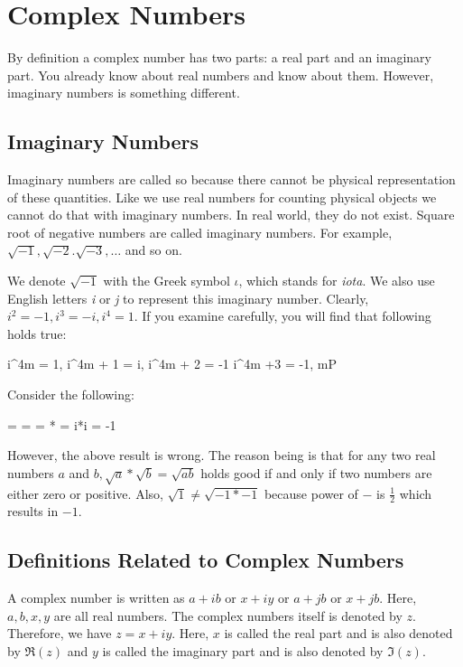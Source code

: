 \chapter{Complex Numbers}
By definition a complex number has two parts: a real part and an imaginary part. You already know about real numbers and know about
them. However, imaginary numbers is something different.
\section{Imaginary Numbers}
Imaginary numbers are called so because there cannot be physical representation of these quantities. Like we use real numbers for
counting physical objects we cannot do that with imaginary numbers. In real world, they do not exist. Square root of negative
numbers are called imaginary numbers. For example, $\sqrt{-1}, \sqrt{-2}. \sqrt{-3}, \ldots$ and so on.

We denote $\sqrt{-1}$ with the Greek symbol $\iota$, which stands for {\it iota}. We also use English letters {\it i} or
{\it j} to represent this imaginary number. Clearly, $i^2 = -1, i^3 = -i, i^4 = 1$. If you examine carefully, you will find that
following holds true:

\startformula i^{4m} = 1, i^{4m + 1} = i, i^{4m + 2} = -1  i^{4m +3} = -1, \forall m\in P\stopformula

{\bf\color[red]{Gotcha:}}

Consider the following:

 =  =  = * = i*i = -1\stopformula

However, the above result is wrong. The reason being is that for any two real numbers $a$ and $b, \sqrt{a}*\sqrt{b} = \sqrt{ab}$
holds good if and only if two numbers are either zero or positive. Also, $\sqrt{1}\neq \sqrt{-1*-1}$ because power of $-$ is
$\frac{1}{2}$ which results in $-1$.

\section{Definitions Related to Complex Numbers}
A complex number is written as $a + ib$ or $x + iy$ or $a + jb$ or $x + jb$. Here, $a, b, x, y$ are all real numbers. The complex
numbers itself is denoted by $z$. Therefore, we have $z = x + iy$. Here, $x$ is called the real part and is also denoted by $\Re(z)$
and $y$ is called the imaginary part and is also denoted by $\Im(z)$.

